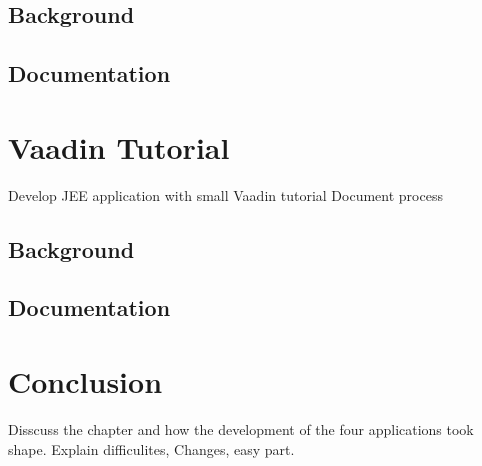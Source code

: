 \subsection{Background}
\subsection{Documentation}

\section{Vaadin Tutorial}
Develop JEE application with small Vaadin tutorial
Document process 
\subsection{Background}
\subsection{Documentation}

\section{Conclusion}
Disscuss the chapter and how the development of the four applications 
took shape. Explain difficulites, Changes, easy part.